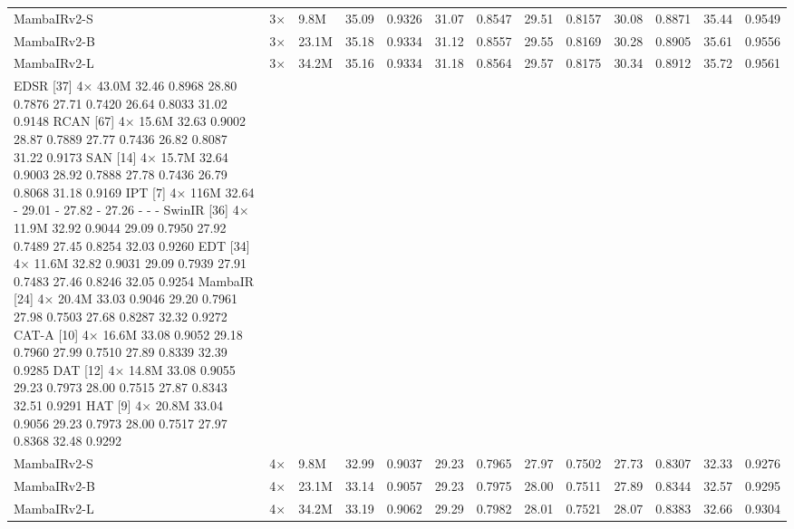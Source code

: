 \begin{tabular}{lllllllllllll}
MambaIRv2-S & 3× & 9.8M & 35.09 & 0.9326 & 31.07 & 0.8547 & 29.51 & 0.8157 & 30.08 & 0.8871 & 35.44 & 0.9549 \\
MambaIRv2-B & 3× & 23.1M & 35.18 & 0.9334 & 31.12 & 0.8557 & 29.55 & 0.8169 & 30.28 & 0.8905 & 35.61 & 0.9556 \\
MambaIRv2-L & 3× & 34.2M & 35.16 & 0.9334 & 31.18 & 0.8564 & 29.57 & 0.8175 & 30.34 & 0.8912 & 35.72 & 0.9561 \\
EDSR [37] 4× 43.0M 32.46 0.8968 28.80 0.7876 27.71 0.7420 26.64 0.8033 31.02 0.9148 RCAN [67] 4× 15.6M 32.63 0.9002 28.87 0.7889 27.77 0.7436 26.82 0.8087 31.22 0.9173 SAN [14] 4× 15.7M 32.64 0.9003 28.92 0.7888 27.78 0.7436 26.79 0.8068 31.18 0.9169 IPT [7] 4× 116M 32.64 - 29.01 - 27.82 - 27.26 - - - SwinIR [36] 4× 11.9M 32.92 0.9044 29.09 0.7950 27.92 0.7489 27.45 0.8254 32.03 0.9260 EDT [34] 4× 11.6M 32.82 0.9031 29.09 0.7939 27.91 0.7483 27.46 0.8246 32.05 0.9254 MambaIR [24] 4× 20.4M 33.03 0.9046 29.20 0.7961 27.98 0.7503 27.68 0.8287 32.32 0.9272 CAT-A [10] 4× 16.6M 33.08 0.9052 29.18 0.7960 27.99 0.7510 27.89 0.8339 32.39 0.9285 DAT [12] 4× 14.8M 33.08 0.9055 29.23 0.7973 28.00 0.7515 27.87 0.8343 32.51 0.9291 HAT [9] 4× 20.8M 33.04 0.9056 29.23 0.7973 28.00 0.7517 27.97 0.8368 32.48 0.9292 &  &  &  &  &  &  &  &  &  &  &  &  \\
MambaIRv2-S & 4× & 9.8M & 32.99 & 0.9037 & 29.23 & 0.7965 & 27.97 & 0.7502 & 27.73 & 0.8307 & 32.33 & 0.9276 \\
MambaIRv2-B & 4× & 23.1M & 33.14 & 0.9057 & 29.23 & 0.7975 & 28.00 & 0.7511 & 27.89 & 0.8344 & 32.57 & 0.9295 \\
MambaIRv2-L & 4× & 34.2M & 33.19 & 0.9062 & 29.29 & 0.7982 & 28.01 & 0.7521 & 28.07 & 0.8383 & 32.66 & 0.9304 \\
\bottomrule
\end{tabular}
